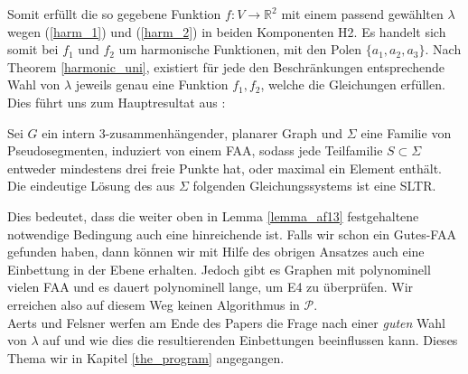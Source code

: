 Somit erfüllt die so gegebene Funktion $f:V\to\mathbb{R}^2$ mit einem passend gewählten $\lambda$ wegen (\ref{harm_1}) und (\ref{harm_2}) in beiden Komponenten H2. Es handelt sich somit bei $f_1$ und $f_2$ um harmonische Funktionen, mit den Polen $\{a_1,a_2,a_3\}$. Nach Theorem \ref{harmonic_uni}, existiert für jede den Beschränkungen entsprechende Wahl von $\lambda$ jeweils genau eine Funktion $f_1,f_2$, welche die Gleichungen erfüllen.\\
Dies führt uns zum Hauptresultat aus \cite[Theorem 2.10]{af13}:

\begin{theorem}\label{com_theo}
Sei $G$ ein intern 3-zusammenhängender, planarer Graph und $\Sigma$ eine Familie von Pseudosegmenten, induziert von einem FAA, sodass jede Teilfamilie $S \subset \Sigma$ entweder mindestens drei freie Punkte hat, oder maximal ein Element enthält. Die eindeutige Lösung des aus $\Sigma$ folgenden Gleichungssystems ist eine SLTR.
\end{theorem}

\begin{remark}
Dies bedeutet, dass die weiter oben in Lemma \ref{lemma_af13} festgehaltene notwendige Bedingung auch eine hinreichende ist. Falls wir schon ein Gutes-FAA gefunden haben, dann können wir mit Hilfe des obrigen Ansatzes auch eine Einbettung in der Ebene erhalten. Jedoch gibt es Graphen mit polynominell vielen FAA und es dauert polynominell lange, um E4 zu überprüfen. Wir erreichen also auf diesem Weg keinen Algorithmus in $\mathcal{P}$.\\
Aerts und Felsner werfen am Ende des Papers die Frage nach einer \textit{guten} Wahl von $\lambda$ auf und wie dies die resultierenden Einbettungen beeinflussen kann. Dieses Thema wir in Kapitel \ref{the_program} angegangen.
\end{remark}


